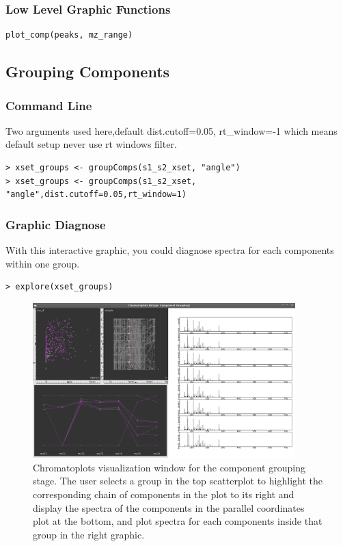 \documentclass[11pt,a4paper]{article}
\begin{document}
\subsubsection*{Low Level Graphic Functions}
\begin{verbatim}
plot_comp(peaks, mz_range)
\end{verbatim}

\newpage
\subsection{Grouping Components}
\subsubsection*{Command Line}
Two arguments used here,default dist.cutoff=0.05, rt\_window=-1 which
means default setup never use rt windows filter.
\begin{verbatim}
> xset_groups <- groupComps(s1_s2_xset, "angle")
> xset_groups <- groupComps(s1_s2_xset, "angle",dist.cutoff=0.05,rt_window=1)
\end{verbatim}

\subsubsection*{Graphic Diagnose}
With this interactive graphic, you could diagnose spectra for each
components within one group.
\begin{verbatim}
> explore(xset_groups)
\end{verbatim}
\begin{figure}[h!t!b!p]
\begin{center}
  \includegraphics[width=4in]{groupcomps.png}
  \caption{\label{fig:findpeaks}Chromatoplots visualization window for
    the component grouping stage. The user selects a group in the top
    scatterplot to highlight the corresponding chain of components in
    the plot to its right and display the spectra of the components in
    the parallel coordinates plot at the bottom, and plot spectra for
    each components inside that group in the right graphic. }
\end{center}
\end{figure}
\end{document}

